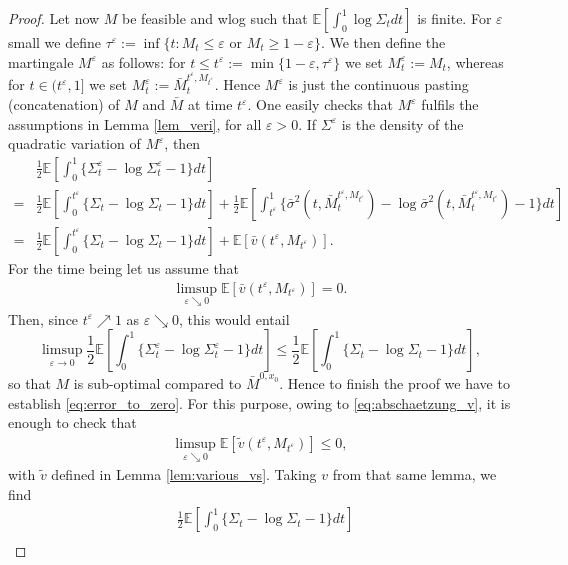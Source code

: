 \documentclass[reqno, a4paper]{amsart}
\theoremstyle{remark}
\newcommand{\1}{\mathbbm 1}
\renewcommand{\epsilon}{\varepsilon}
\numberwithin{equation}{section}
\numberwithin{theorem}{section}
\newcommand{\mo}{\bar{M}}
\newcommand{\vo}{\bar{v}}
\newcommand{\so}{\bar{\sigma}}
\begin{document}
\begin{proof}
Let now $M$ be feasible and wlog such that $\mathbb E[\int_0^1\log \Sigma_t dt]$ is finite. For $\epsilon$ small we define $\tau^\epsilon:=\inf \{t:M_t\leq \epsilon \text{ or }M_t\geq 1-\epsilon\}$. We then define the martingale $M^\epsilon$ as follows: for $t\leq t^\epsilon:=\min\{1-\epsilon,\tau^{\epsilon}\}$ we set $M^\epsilon_t:=M_{t}$, whereas for $t\in(t^{\epsilon},1]$ we set $M^\epsilon_t:= \mo^{t^{\epsilon},M_{t^\epsilon}}_t$. Hence $M^\epsilon$ is just the continuous pasting (concatenation) of $M$ and $\mo$ at time $t^\epsilon$. One easily checks that $M^\epsilon$ fulfils the assumptions in Lemma \ref{lem_veri}, for all $\epsilon>0$. If $\Sigma^\epsilon$ is the density of the quadratic variation of $M^\epsilon$, then
\begin{align*}
&\frac{1}{2}\mathbb E\left [\int_0^1\{\Sigma^\epsilon_t - \log\Sigma^\epsilon_t -1\} dt\right ]	\\ = & 
\frac{1}{2}\mathbb E\left [\int_0^{t^\epsilon}\{\Sigma_t - \log\Sigma_t -1\} dt\right ] + \frac{1}{2}\mathbb E\left [\int^1_{t^\epsilon}\{\so^2(t,\mo_t^{t^\epsilon,M_{t^\epsilon} }) - \log\so^2(t,\mo_t^{t^{\epsilon},M_{t^\epsilon}}) -1\} dt \right ]\\
=& \frac{1}{2}\mathbb E\left [\int_0^{t^\epsilon}\{\Sigma_t - \log\Sigma_t -1\} dt\right ] + \mathbb E[\vo(t^{\epsilon}, M_{t^\epsilon})].
\end{align*}
For the time being let us assume that
\begin{align}
\label{eq:error_to_zero}
	\limsup_{\epsilon\searrow 0}\mathbb E[\vo(t^{\epsilon}, M_{t^\epsilon})]=0.
\end{align}
Then, since $t^\epsilon\nearrow 1$ as $\epsilon\searrow 0$, this would entail
\[\limsup_{\epsilon \to 0} \frac{1}{2}\mathbb E\left [\int_0^1\{\Sigma^\epsilon_t - \log\Sigma^\epsilon_t -1\} dt\right ] \leq \frac{1}{2}\mathbb E\left [\int_0^{1}\{\Sigma_t - \log\Sigma_t -1\} dt\right ],\]
so that $M$ is sub-optimal compared to  $\mo^{0,x_0}$. Hence to finish the proof we have to establish \eqref{eq:error_to_zero}. For this purpose, owing to \eqref{eq:abschaetzung_v}, it is enough to check that
\begin{align} \label{eq:error_to_zero2}
	\limsup_{\epsilon\searrow 0}\mathbb E[\tilde v(t^{\epsilon}, M_{t^\epsilon})]\leq 0,
\end{align}
with $\tilde v$ defined in Lemma \ref{lem:various_vs}. Taking $v$ from that same lemma, we find
\begin{align*}
&\frac{1}{2}\mathbb E\left [\int_0^{1}\{\Sigma_t - \log\Sigma_t -1\} dt\right ] \\

\end{align*}
\end{proof}
\end{document}
